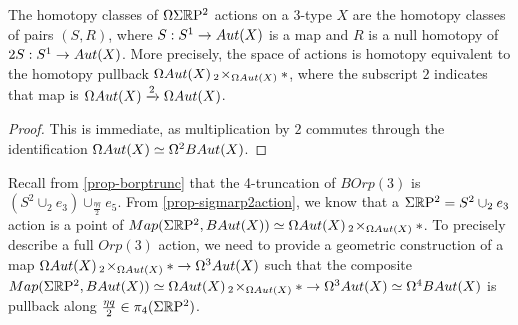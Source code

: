\documentclass{amsart}
\begin{document}
\begin{prop} 
\label{prop-sigmarp2action}
The homotopy classes of $\Omega \Sigma \mathbb R \mathrm{P}^2$ actions on a 3-type $X$ are the homotopy classes of pairs $(S,R)$, where $S: S^1 \rightarrow Aut(X)$ is a map and $R$ is a null homotopy of $2S: S^1 \rightarrow Aut(X)$.  More precisely, the space of actions is homotopy equivalent to the homotopy pullback $\Omega Aut(X) \,_2\!\times_{\Omega Aut(X)} \ast$, where the subscript $2$ indicates that map is $\Omega Aut(X) \xrightarrow{2} \Omega Aut(X)$.
\end{prop}
\begin{proof}
This is immediate, as multiplication by $2$ commutes through the identification $\Omega Aut(X) \simeq \Omega^2 BAut(X)$.
\end{proof}

Recall from \cref{prop-borptrunc} that the 4-truncation of $BOrp(3)$ is $(S^2 \cup_2 e_3) \cup_{\frac{\eta q}{2}} e_5$.  From \cref{prop-sigmarp2action}, we know that a $\Sigma \mathbb R \mathrm{P}^2 = S^2 \cup_2 e_3$ action is a point of $Map(\Sigma \mathbb R \mathrm{P}^2,BAut(X)) \simeq \Omega Aut(X) \,_2\! \times_{\Omega Aut(X)} \ast$.  To precisely describe a full $Orp(3)$ action, we need to provide a geometric construction of a map $\Omega Aut(X) \,_2\! \times_{\Omega Aut(X)} \ast \rightarrow \Omega^3 Aut(X)$ such that the composite $Map(\Sigma \mathbb R \mathrm{P}^2,BAut(X)) \simeq \Omega Aut(X) \,_2\! \times_{\Omega Aut(X)} \ast \rightarrow \Omega^3 Aut(X) \simeq \Omega^4 BAut(X)$ is pullback along $\frac{\eta q}{2} \in \pi_4(\Sigma\mathbb R \mathrm{P}^2)$.  
\end{document}
